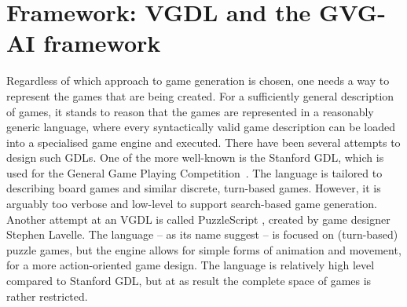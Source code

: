 \documentclass[a4paper,titlepage,final]{report}
\begin{document}





\section{Framework: VGDL and the GVG-AI framework}
\label{sec_gvgaiframework}
Regardless of which approach to game generation is chosen, one needs a way to represent the games that are being created. %
For a sufficiently general description of games, it stands to reason that the games are represented in a reasonably generic language, where every syntactically valid game description can be loaded into a specialised game engine and executed. 
There have been several attempts to design such GDLs. One of the more well-known is the Stanford GDL, which is used for the General Game Playing Competition~\citep{genesereth2005general}. The language is tailored to describing board games and similar discrete, turn-based games. 
However, it is arguably too verbose and low-level to support search-based game generation. 
Another attempt at an VGDL is called PuzzleScript \citep{puzzlescript}, created by game designer Stephen Lavelle. 
The language -- as its name suggest -- is focused on (turn-based) puzzle games, but the engine allows for simple forms of animation and movement, for a more action-oriented game design. 
The language is relatively high level compared to Stanford GDL, but at as result the complete space of  games is rather restricted.
\end{document}
